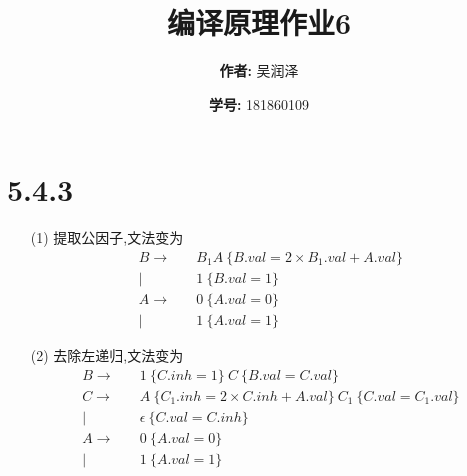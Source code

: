 \documentclass[11pt]{article}
\title{编译原理作业6}
\author{
			\textbf{作者:} {吴润泽}
			\and {\textbf{学号:} 181860109}
		}
\begin{document}
\maketitle
\section*{5.4.3}
\begin{itemize}
	\item[(1)]提取公因子,文法变为
	      \begin{equation}
		      \begin{aligned}
			      B \rightarrow\quad & B_{1} A\ \{B.val=2\times B_1.val+A.val\} \\
			      |\quad             & 1\ \{B.val=1\}                           \\
			      A \rightarrow\quad & 0\ \{A.val=0\}                           \\
			      |\quad             & 1\ \{A.val=1\}
		      \end{aligned}
	      \end{equation}
	\item[(2)]去除左递归,文法变为
	      \begin{equation}
		      \begin{aligned}
			      B \rightarrow\quad & 1\ \{C.inh=1\}\ C\ \{B.val=C.val\}                         \\
			      C \rightarrow\quad & A\ \{C_1.inh=2\times C.inh+A.val\}\ C_1\ \{C.val=C_1.val\} \\
			      |\quad             & \epsilon\ \{C.val=C.inh\}                                  \\
			      A \rightarrow\quad & 0\ \{A.val=0\}                                             \\
			      |\quad             & 1\ \{A.val=1\}
		      \end{aligned}
	      \end{equation}
\end{itemize}
\end{document}
